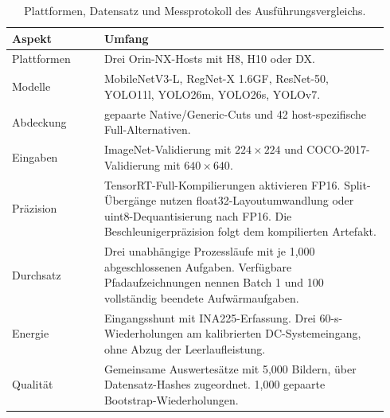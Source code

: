 \begin{table}[t]
\centering\small
\caption{Plattformen, Datensatz und Messprotokoll des Ausführungsvergleichs.}
\label{tab:experimental-scope}
\setlength{\tabcolsep}{3pt}
\begin{tabular}{@{}>{\raggedright\arraybackslash}p{0.23\linewidth}>{\raggedright\arraybackslash}p{0.71\linewidth}@{}}
\toprule
Aspekt & Umfang \\
\midrule
Plattformen & Drei Orin-NX-Hosts mit H8, H10 oder DX. \\
Modelle & MobileNetV3-L, RegNet-X 1.6GF, ResNet-50, YOLO11l, YOLO26m, YOLO26s, YOLOv7. \\
Abdeckung & 204 gepaarte Native/Generic-Cuts und 42 host-spezifische Full-Alternativen. \\
Eingaben & ImageNet-Validierung mit $224\times224$ und COCO-2017-Validierung mit $640\times640$. \\
Präzision & TensorRT-Full-Kompilierungen aktivieren FP16. Split-Übergänge nutzen float32-Layoutumwandlung oder uint8-Dequantisierung nach FP16. Die Beschleunigerpräzision folgt dem kompilierten Artefakt. \\
Durchsatz & Drei unabhängige Prozessläufe mit je 1,000 abgeschlossenen Aufgaben. Verfügbare Pfadaufzeichnungen nennen Batch 1 und 100 vollständig beendete Aufwärmaufgaben. \\
Energie & Eingangsshunt mit INA225-Erfassung. Drei 60-s-Wiederholungen am kalibrierten DC-Systemeingang, ohne Abzug der Leerlaufleistung. \\
Qualität & Gemeinsame Auswertesätze mit 5,000 Bildern, über Datensatz-Hashes zugeordnet. 1,000 gepaarte Bootstrap-Wiederholungen. \\
\bottomrule
\end{tabular}
\end{table}
